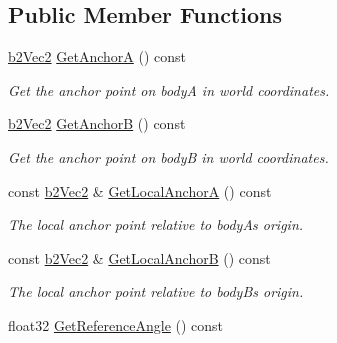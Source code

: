 \subsection*{Public Member Functions}
\begin{DoxyCompactItemize}
\item 
\hyperlink{structb2_vec2}{b2\+Vec2} \hyperlink{classb2_revolute_joint_a7f266986c12009973fd74c9828b6c236}{Get\+AnchorA} () const \hypertarget{classb2_revolute_joint_a7f266986c12009973fd74c9828b6c236}{}\label{classb2_revolute_joint_a7f266986c12009973fd74c9828b6c236}

\begin{DoxyCompactList}\small\item\em Get the anchor point on bodyA in world coordinates. \end{DoxyCompactList}\item 
\hyperlink{structb2_vec2}{b2\+Vec2} \hyperlink{classb2_revolute_joint_a3a67ad189b29ea8ab6602a28697807f6}{Get\+AnchorB} () const \hypertarget{classb2_revolute_joint_a3a67ad189b29ea8ab6602a28697807f6}{}\label{classb2_revolute_joint_a3a67ad189b29ea8ab6602a28697807f6}

\begin{DoxyCompactList}\small\item\em Get the anchor point on bodyB in world coordinates. \end{DoxyCompactList}\item 
const \hyperlink{structb2_vec2}{b2\+Vec2} \& \hyperlink{classb2_revolute_joint_af270a3029b2573bf85cde345c22d65ab}{Get\+Local\+AnchorA} () const \hypertarget{classb2_revolute_joint_af270a3029b2573bf85cde345c22d65ab}{}\label{classb2_revolute_joint_af270a3029b2573bf85cde345c22d65ab}

\begin{DoxyCompactList}\small\item\em The local anchor point relative to bodyA\textquotesingle{}s origin. \end{DoxyCompactList}\item 
const \hyperlink{structb2_vec2}{b2\+Vec2} \& \hyperlink{classb2_revolute_joint_a985f788cffd53d7bb926b11cf77734e4}{Get\+Local\+AnchorB} () const \hypertarget{classb2_revolute_joint_a985f788cffd53d7bb926b11cf77734e4}{}\label{classb2_revolute_joint_a985f788cffd53d7bb926b11cf77734e4}

\begin{DoxyCompactList}\small\item\em The local anchor point relative to bodyB\textquotesingle{}s origin. \end{DoxyCompactList}\item 
float32 \hyperlink{classb2_revolute_joint_acfe881247b1f1f8f12aefd3a8f0cfd00}{Get\+Reference\+Angle} () const \hypertarget{classb2_revolute_joint_acfe881247b1f1f8f12aefd3a8f0cfd00}{}\label{classb2_revolute_joint_acfe881247b1f1f8f12aefd3a8f0cfd00}


\end{DoxyCompactItemize}
